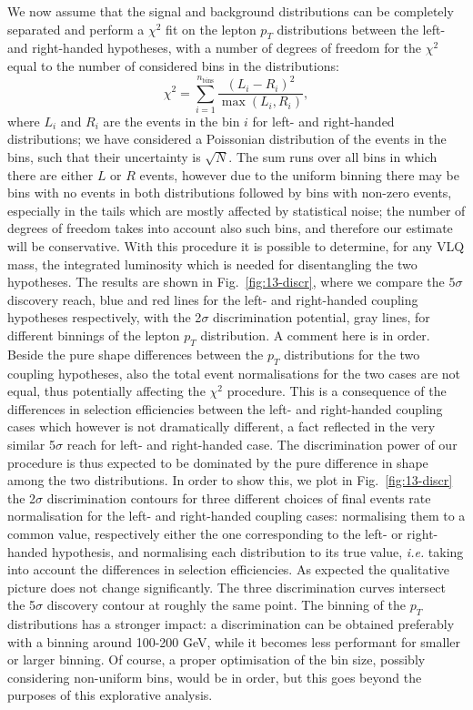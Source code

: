 \documentclass[a4paper]{article}
\begin{document}
We now assume that the signal and background distributions can be completely separated and perform a $\chi^2$ fit on the lepton $p_T$ distributions between the left- and right-handed hypotheses, with a number of degrees of freedom for the $\chi^2$ equal to the number of considered bins in the distributions:
\begin{equation}
\chi^2 = \sum _{i=1}^{n_{\text{bins}}} \frac{(L_i - R_i)^2}{\max \left(L_i,R_i \right)},
\end{equation}
where $L_i$ and $R_i$ are the events in the bin $i$ for left- and right-handed distributions; we have considered a Poissonian distribution of the events in the bins, such that their uncertainty is $\sqrt{N}$. The sum runs over all bins in which there are either $L$ or $R$ events, however due to the uniform binning there may be bins with no events in both distributions followed by bins with non-zero events, especially in the tails which are mostly affected by statistical noise; the number of degrees of freedom takes into account also such bins, and therefore our estimate will be conservative.
With this procedure it is possible to determine, for any VLQ mass, the integrated luminosity which is needed for disentangling the two hypotheses. The results are shown in Fig.~\ref{fig:13-discr}, where we compare the $5\sigma$ discovery reach, blue and red lines for the left- and right-handed coupling hypotheses respectively, with the 2$\sigma$ discrimination potential, gray lines, for different binnings of the lepton $p_T$ distribution. 
%
%
A comment here is in order. Beside the pure shape differences between the $p_T$ distributions for the two coupling hypotheses, also the total event normalisations for the two cases are not equal, thus potentially affecting the $\chi^2$ procedure. This is a consequence of the differences in selection efficiencies between the left- and right-handed coupling cases which however is not dramatically different, a fact reflected in the very similar 5$\sigma$ reach for left- and right-handed case. The discrimination power of our procedure is thus expected to be dominated by the pure difference in shape among the two distributions. In order to show this, we plot in Fig.~\ref{fig:13-discr} the 2$\sigma$ discrimination contours for three different choices of final events rate normalisation for the left- and right-handed coupling cases: normalising them to a common value, respectively either the one corresponding to the left- or right-handed hypothesis, and normalising each distribution to its true value, {\emph{i.e.}} taking into account the differences in selection efficiencies.
As expected the qualitative picture does not change significantly. The three discrimination curves intersect the 5$\sigma$ discovery contour at roughly the same point.
%
 The binning of the $p_T$ distributions has a stronger impact: a discrimination can be obtained preferably with a binning around 100-200 GeV, while it becomes less performant for smaller or larger binning. Of course, a proper optimisation of the bin size, possibly considering non-uniform bins, would be in order, but this goes beyond the purposes of this explorative analysis.
\end{document}
